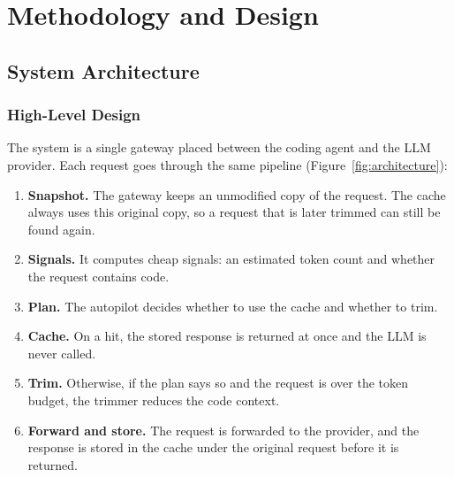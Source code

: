 \documentclass[12pt, a4paper, oneside]{report}
\begin{document}
\chapter{Methodology and Design}

\section{System Architecture}

\subsection{High-Level Design}

The system is a single gateway placed between the coding agent and the LLM
provider. Each request goes through the same pipeline
(Figure~\ref{fig:architecture}):

\begin{enumerate}
    \item \textbf{Snapshot.} The gateway keeps an unmodified copy of the request.
          The cache always uses this original copy, so a request that is later
          trimmed can still be found again.
    \item \textbf{Signals.} It computes cheap signals: an estimated token count and
          whether the request contains code.
    \item \textbf{Plan.} The autopilot decides whether to use the cache and whether
          to trim.
    \item \textbf{Cache.} On a hit, the stored response is returned at once and the
          LLM is never called.
    \item \textbf{Trim.} Otherwise, if the plan says so and the request is over the
          token budget, the trimmer reduces the code context.
    \item \textbf{Forward and store.} The request is forwarded to the provider, and
          the response is stored in the cache under the original request before it
          is returned.
\end{enumerate}
\end{document}
